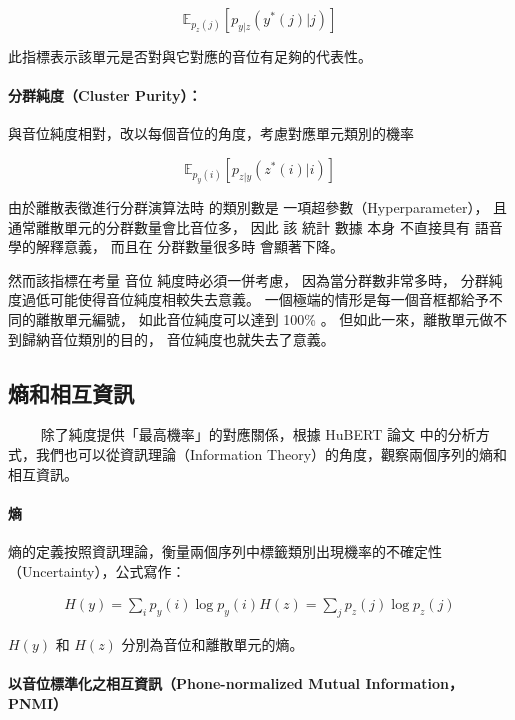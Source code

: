 \newcommand{\E}{\mathbb{E}}

$$\E_{p_z(j)}\left[p_{y|z}(y^*(j)|j) \right]$$

此指標表示該單元是否對與它對應的音位有足夠的代表性。

\paragraph{
分群純度（Cluster Purity）：}
與音位純度相對，改以每個音位的角度，考慮對應單元類別的機率

$$\E_{p_y(i)}\left[p_{z|y}(z^*(i)|i) \right]$$

由於離散表徵進行分群演算法時
的類別數是
一項超參數（Hyperparameter），
且通常離散單元的分群數量會比音位多，
因此
該
統計
數據
本身
不直接具有
語音學的解釋意義，
而且在
分群數量很多時
會顯著下降。

然而該指標在考量
音位
純度時必須一併考慮，
因為當分群數非常多時，
分群純度過低可能使得音位純度相較失去意義。
一個極端的情形是每一個音框都給予不同的離散單元編號，
如此音位純度可以達到 100\%
。
但如此一來，離散單元做不到歸納音位類別的目的，
音位純度也就失去了意義。





\subsection{熵和相互資訊}
　　
除了純度提供「最高機率」的對應關係，根據 HuBERT 論文 \cite{hsu_hubert_2021-2} 中的分析方式，我們也可以從資訊理論（Information Theory）的角度，觀察兩個序列的熵和相互資訊。

\paragraph{熵}

熵的定義按照資訊理論，衡量兩個序列中標籤類別出現機率的不確定性（Uncertainty），公式寫作：

\begin{align}
    H(y) = \sum_i{p_y(i)\log p_y(i)}
    H(z) = \sum_j{p_z(j)\log p_z(j)}
\end{align}

$H(y)$ 和 $H(z)$ 分別為音位和離散單元的熵。

\paragraph{以音位標準化之相互資訊（Phone-normalized Mutual Information，PNMI）}

